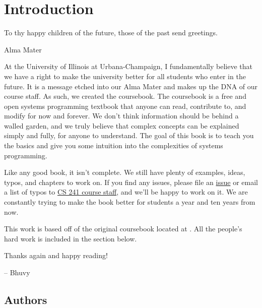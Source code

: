 \chapter{Introduction}

\epigraph{To thy happy children of the future, those of the past send greetings.}{Alma Mater}

At the University of Illinois at Urbana-Champaign, I fundamentally believe that we have a right to make the university better for all students who enter in the future.
It is a message etched into our Alma Mater and makes up the DNA of our course staff.
As such, we created the coursebook.
The coursebook is a free and open systems programming textbook that anyone can read, contribute to, and modify for now and forever.
We don't think information should be behind a walled garden, and we truly believe that complex concepts can be explained simply and fully, for anyone to understand.
The goal of this book is to teach you the basics and give you some intuition into the complexities of systems programming.

Like any good book, it isn't complete.
We still have plenty of examples, ideas, typos, and chapters to work on.
If you find any issues, please file an \href{https://github.com/illinois-cs241/coursebook/issues}{issue} or email a list of typos to \href{http://cs241.cs.illinois.edu/staff}{CS 241 course staff}, and we'll be happy to work on it.
We are constantly trying to make the book better for students a year and ten years from now.

This work is based off of the original coursebook located at .
All the people's hard work is included in the section below.

Thanks again and happy reading!

-- Bhuvy

\section{Authors}



